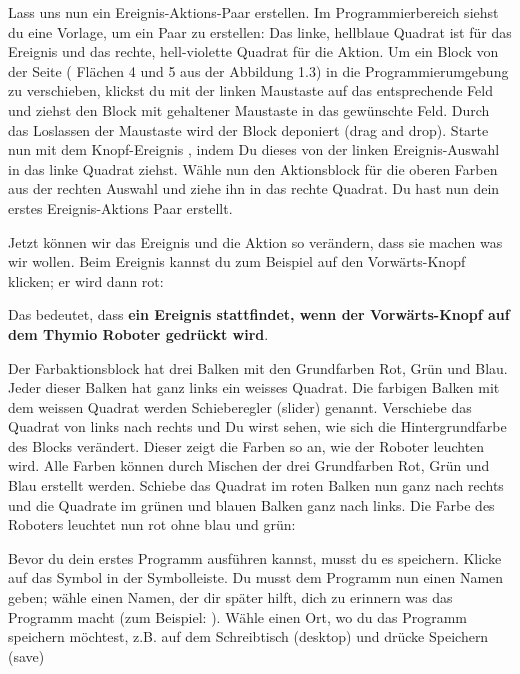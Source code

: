 
Lass uns nun ein Ereignis-Aktions-Paar erstellen. Im Programmierbereich siehst
du eine Vorlage, um ein Paar zu erstellen:  Das
linke, hellblaue Quadrat ist für das Ereignis und das rechte, hell-violette
Quadrat für die Aktion. Um ein Block von der Seite ( Flächen 4 und 5 aus der Abbildung 1.3) in die Programmierumgebung zu verschieben, klickst du mit der linken Maustaste auf das entsprechende Feld und ziehst den Block mit gehaltener Maustaste in das gewünschte Feld. Durch das Loslassen der Maustaste wird der Block deponiert (drag and drop). Starte nun mit dem Knopf-Ereignis , indem Du dieses
von der linken Ereignis-Auswahl in das linke Quadrat ziehst. Wähle nun den
Aktionsblock für die oberen Farben  aus der rechten
Auswahl und ziehe ihn in das rechte Quadrat. Du hast nun dein erstes
Ereignis-Aktions Paar erstellt.

Jetzt können wir das Ereignis und die Aktion so verändern, dass sie machen was
wir wollen. Beim Ereignis kannst du zum Beispiel auf den Vorwärts-Knopf
klicken; er wird dann rot: 

Das bedeutet, dass \textbf{ein Ereignis stattfindet, wenn der Vorwärts-Knopf auf dem Thymio Roboter
gedrückt wird}.

Der Farbaktionsblock hat drei Balken mit den Grundfarben Rot, Grün und Blau.
Jeder dieser Balken hat ganz links ein weisses Quadrat. Die farbigen Balken mit dem weissen Quadrat werden Schieberegler (slider) genannt. Verschiebe das Quadrat von links nach rechts und Du wirst sehen, wie sich die Hintergrundfarbe des Blocks verändert. Dieser zeigt die Farben so an, wie der Roboter leuchten wird. Alle Farben können durch Mischen der drei Grundfarben Rot, Grün und Blau erstellt werden.
Schiebe das Quadrat im roten Balken nun ganz nach rechts und die Quadrate im grünen und blauen Balken ganz nach links. Die Farbe  des Roboters
leuchtet nun rot ohne blau und grün: 


Bevor du dein erstes Programm ausführen kannst, musst du es speichern. Klicke
auf das Symbol  in der Symbolleiste. Du musst dem Programm nun
einen Namen geben; wähle einen Namen, der dir später hilft, dich zu erinnern
was das Programm macht (zum Beispiel: ). Wähle einen Ort, wo du das Programm speichern möchtest, z.B. auf dem Schreibtisch (desktop) und drücke Speichern (save)

